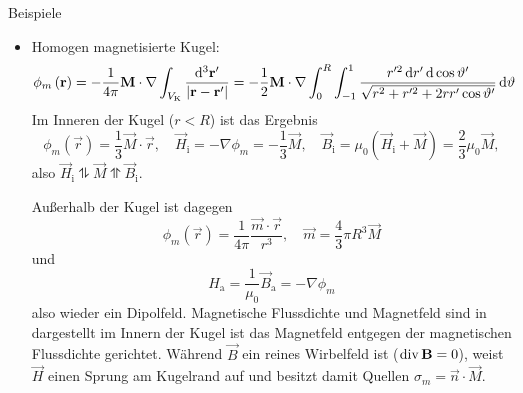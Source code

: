 Beispiele
\begin{itemize}
	\item Homogen magnetisierte Kugel:
	      \begin{equation*}
		      \phi _{m}\left(\vec {r}\right)=-\frac{1}{4\pi }\vec {M}\cdot \nabla \int _{V_{\mathrm{K}}}\frac{\diffa[3]{\vec{r}'}}{\left| \vec {r}-\vec {r}'\right| }=-\frac{1}{2}\vec {M}\cdot \nabla \int _{0}^{R}\int _{-1}^{1}\frac{r'^{2}\diff r'\diff \cos \vartheta '}{\sqrt{r^{2}+r'^{2}+2rr'\cos \vartheta '}}\diff \vartheta
	      \end{equation*}
	      Im Inneren der Kugel ($r<R$) ist das Ergebnis
	      \begin{equation*}
		      \phi _{m}\left(\vec {r}\right)=\frac{1}{3}\vec {M}\cdot \vec {r}, \quad\vec {H}_{\mathrm{i}}=-\nabla \phi _{m}=-\frac{1}{3}\vec {M},\quad \vec {B}_{\mathrm{i}}=\mu _{0}\left(\vec {H}_{\mathrm{i}}+\vec {M}\right)=\frac{2}{3}\mu _{0}\vec {M},
	      \end{equation*}
	      also $\vec {H}_{\mathrm{i}}\updownharpoons \vec {M}\upupharpoons \vec {B}_{\mathrm{i}}$.

	      Außerhalb der Kugel ist dagegen
	      \begin{equation*}
		      \phi _{m}\left(\vec {r}\right)=\frac{1}{4\pi }\frac{\vec {m}\cdot \vec {r}}{r^{3}},\quad \vec {m}=\frac{4}{3}\pi R^{3}\vec {M}
	      \end{equation*}
	      und
	      \begin{equation*}
		      H_{\mathrm{a}}=\frac{1}{\mu _{0}}\vec {B}_{\mathrm{a}}=-\nabla \phi _{m}
	      \end{equation*}
	      also wieder ein Dipolfeld. Magnetische Flussdichte und Magnetfeld sind in  dargestellt \textendash{} im Innern der Kugel ist das Magnetfeld entgegen der magnetischen Flussdichte gerichtet. Während $\vec {B}$ ein reines Wirbelfeld ist ($\divg \vec {B}=0$), weist $\vec {H}$ einen Sprung am Kugelrand auf und besitzt damit Quellen $\sigma _{m}=\vec {n}\cdot \vec {M}$.


\end{itemize}
